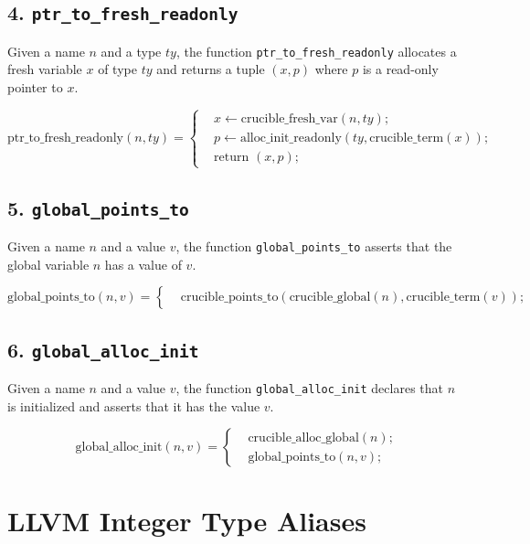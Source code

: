 \subsection*{4. \texttt{ptr\_to\_fresh\_readonly}}

Given a name \( n \) and a type \( ty \), the function \texttt{ptr\_to\_fresh\_readonly} allocates a fresh variable \( x \) of type \( ty \) and returns a tuple \( (x, p) \) where \( p \) is a read-only pointer to \( x \).

\[
\text{ptr\_to\_fresh\_readonly}(n, ty) = \left\{
\begin{aligned}
	& x \leftarrow \text{crucible\_fresh\_var}(n, ty); \\
	& p \leftarrow \text{alloc\_init\_readonly}(ty, \text{crucible\_term}(x)); \\
	& \text{return } (x, p);
\end{aligned}
\right.
\]

\subsection*{5. \texttt{global\_points\_to}}

Given a name \( n \) and a value \( v \), the function \texttt{global\_points\_to} asserts that the global variable \( n \) has a value of \( v \).

\[
\text{global\_points\_to}(n, v) = \left\{
\begin{aligned}
	& \text{crucible\_points\_to}(\text{crucible\_global}(n), \text{crucible\_term}(v));
\end{aligned}
\right.
\]

\subsection*{6. \texttt{global\_alloc\_init}}

Given a name \( n \) and a value \( v \), the function \texttt{global\_alloc\_init} declares that \( n \) is initialized and asserts that it has the value \( v \).

\[
\text{global\_alloc\_init}(n, v) = \left\{
\begin{aligned}
	& \text{crucible\_alloc\_global}(n); \\
	& \text{global\_points\_to}(n, v);
\end{aligned}
\right.
\]

\section*{LLVM Integer Type Aliases}

